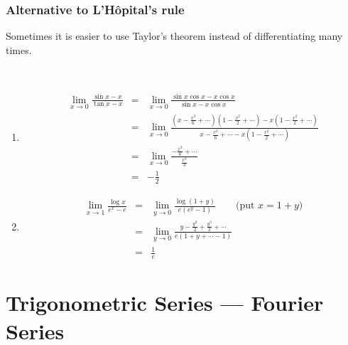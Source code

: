 \documentclass[12pt]{report}
\theoremstyle{definition}
\begin{document}
\subsection{Alternative to L'Hôpital's rule}
Sometimes it is easier to use Taylor's theorem instead of differentiating many times.
\begin{ex}
    \,

    \begin{enumerate}[label = (\arabic*)]
        \item 
            \begin{eqnarray*}
                \lim_{x \rightarrow 0} \frac{\sin{x} - x}{\tan{x} - x}
                &=& \lim_{x \rightarrow 0} \frac{\sin{x}\cos{x} - x\cos{x}}{\sin{x} - x\cos{x}} \\
                &=& \lim_{x \rightarrow 0} \frac{\left(x - \frac{x^{3}}{6} + \cdots\right) 
                \left(1-\frac{x^{2}}{2} + \cdots\right) - x \left(1 - \frac{x^{2}}{2} + \cdots\right)}
                {x - \frac{x^{3}}{6} + \cdots - x\left(1 - \frac{x^{2}}{2} + \cdots\right) } \\
                &=& \lim_{x \rightarrow 0} \frac{-\frac{x^{3}}{6} + \cdots}{\frac{x^{3}}{3}} \\
                &=& -\frac{1}{2}
            \end{eqnarray*}
        \item 
            \begin{eqnarray*}
                \lim_{x \rightarrow 1} \frac{\log{x}}{e^{x} - e}
                &=& \lim_{y \rightarrow 0} \frac{\log{(1+y)}}{e(e^{y}-1)} \qquad \text{(put $x = 1 + y$)}\\
                &=& \lim_{y \rightarrow 0} \frac{y - \frac{y^{2}}{2} + \frac{y^{3}}{3} + \cdots}
                {e(1 + y + \cdots - 1)} \\
                &=& \frac{1}{e}
            \end{eqnarray*}
    \end{enumerate}
\end{ex}

\chapter{Trigonometric Series --- Fourier Series}
\end{document}
